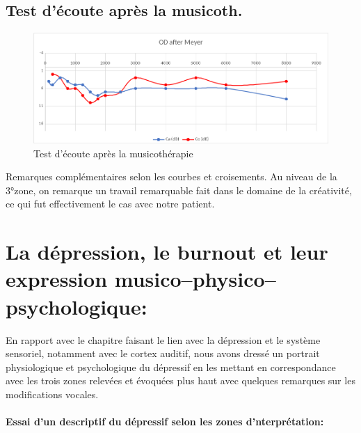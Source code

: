 \begin{enumerate}
      


        
    	\subsection{Test d'écoute après la musicoth.}
 	
 	\begin{figure}[h]
 		\centering

 		\includegraphics[width=0.7\linewidth]{images/clinique/od_after_meyer.png}
 		\caption{Test d'écoute après la musicothérapie}
 		\label{fig:odaftermeyer}
 	\end{figure}
 
  Remarques complémentaires selon les courbes et
  croisements.
  Au niveau de la 3°zone, on remarque un travail remarquable fait dans
  le domaine de la créativité, ce qui fut effectivement le cas avec
  notre patient.
     













        
  \section{La dépression, le burnout et leur expression
    musico--physico--psychologique:}

  
En rapport  avec le chapitre faisant le lien avec la dépression et le
système sensoriel, notamment avec le cortex auditif, nous
avons dressé un portrait
physiologique et psychologique du dépressif 
  en les mettant en correspondance avec les trois zones relevées et
  évoquées plus haut avec quelques remarques sur 
les modifications vocales.
 \paragraph{Essai d'un descriptif du dépressif selon les zones d'nterprétation:}


\end{enumerate}
